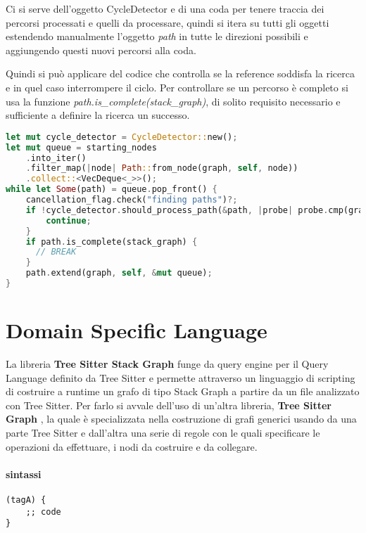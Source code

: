 Ci si serve dell'oggetto CycleDetector e di una coda per tenere traccia dei percorsi processati e quelli da processare, quindi si itera su tutti gli oggetti estendendo manualmente l'oggetto \emph{path} in tutte le direzioni possibili e aggiungendo questi nuovi percorsi alla coda.

Quindi si pu\`o applicare del codice che controlla se la reference soddisfa la ricerca e in quel caso interrompere il ciclo. Per controllare se un percorso \`e completo si usa la funzione \emph{path.is\_complete(stack\_graph)}, di solito requisito necessario e sufficiente a definire la ricerca un successo.

\begin{lstlisting}[language=Rust]
let mut cycle_detector = CycleDetector::new();
let mut queue = starting_nodes
    .into_iter()
    .filter_map(|node| Path::from_node(graph, self, node))
    .collect::<VecDeque<_>>();
while let Some(path) = queue.pop_front() {
    cancellation_flag.check("finding paths")?;
    if !cycle_detector.should_process_path(&path, |probe| probe.cmp(graph, self, &path)) {
        continue;
    }
    if path.is_complete(stack_graph) {
      // BREAK
    }
    path.extend(graph, self, &mut queue);
}
\end{lstlisting}

\section{Domain Specific Language}

La libreria \textbf{Tree Sitter Stack Graph} \cite{TreeSitterStackGraph} funge da query engine per il Query Language definito da Tree Sitter e permette attraverso un linguaggio di scripting di costruire a runtime un grafo di tipo Stack Graph a partire da un file analizzato con Tree Sitter.
Per farlo si avvale dell'uso di un'altra libreria, \textbf{Tree Sitter Graph} \cite{TreeSitterGraph}, la quale \`e specializzata nella costruzione di grafi generici usando da una parte Tree Sitter e dall'altra una serie di regole con le quali specificare le operazioni da effettuare, i nodi da costruire e da collegare.

\paragraph{sintassi}

\begin{lstlisting}
(tagA) {
    ;; code
}
\end{lstlisting}

